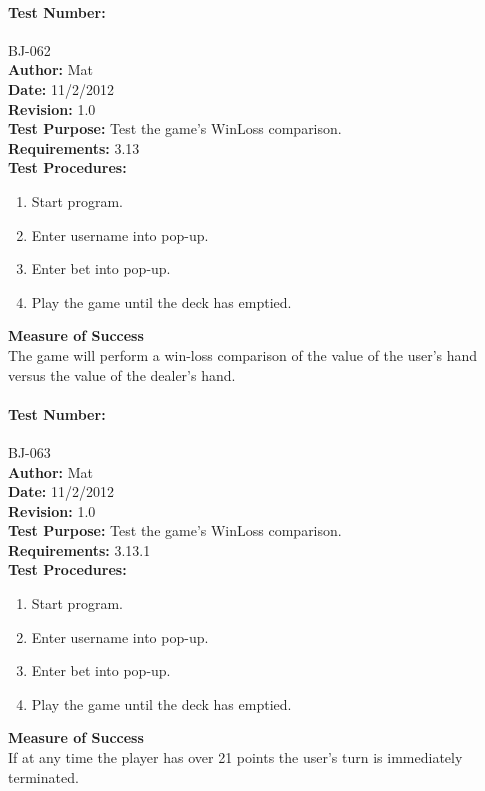 \documentclass{article}
\begin{document}
\paragraph{Test Number:} BJ-062\\
\textbf{Author:} Mat\\
\textbf{Date:} 11/2/2012\\
\textbf{Revision:} 1.0\\
\textbf{Test Purpose:} Test the game's WinLoss comparison.\\
\textbf{Requirements:} 3.13 \\
\textbf{Test Procedures:} 
\begin{enumerate}
\item Start program.
\item Enter username into pop-up.
\item Enter bet into pop-up.
\item Play the game until the deck has emptied.
\end{enumerate}
\textbf{Measure of Success}\\The game will perform a win-loss comparison of the value of the user's hand versus the value of the dealer's hand.
\paragraph{Test Number:} BJ-063\\
\textbf{Author:} Mat\\
\textbf{Date:} 11/2/2012\\
\textbf{Revision:} 1.0\\
\textbf{Test Purpose:} Test the game's WinLoss comparison.\\
\textbf{Requirements:} 3.13.1 \\
\textbf{Test Procedures:} 
\begin{enumerate}
\item Start program.
\item Enter username into pop-up.
\item Enter bet into pop-up.
\item Play the game until the deck has emptied.
\end{enumerate}
\textbf{Measure of Success}\\If at any time the player has over 21 points the user's turn is immediately terminated.
\end{document}
